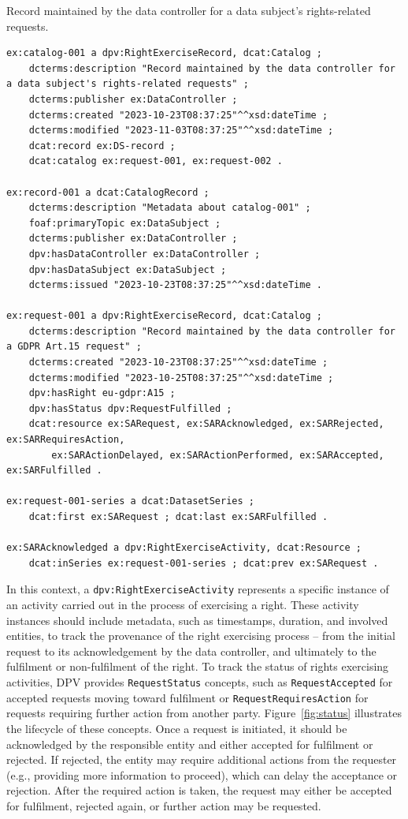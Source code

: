 \documentclass{IOS-Book-Article}     %
\begin{document}
\begin{listing}[ht]
\caption{Record maintained by the data controller for a data subject's rights-related requests.}
\label{lst:record}
\begin{verbatim}
ex:catalog-001 a dpv:RightExerciseRecord, dcat:Catalog ;
    dcterms:description "Record maintained by the data controller for a data subject's rights-related requests" ;
    dcterms:publisher ex:DataController ;
    dcterms:created "2023-10-23T08:37:25"^^xsd:dateTime ;
    dcterms:modified "2023-11-03T08:37:25"^^xsd:dateTime ;
    dcat:record ex:DS-record ;
    dcat:catalog ex:request-001, ex:request-002 .

ex:record-001 a dcat:CatalogRecord ;
    dcterms:description "Metadata about catalog-001" ;
    foaf:primaryTopic ex:DataSubject ;
    dcterms:publisher ex:DataController ;
    dpv:hasDataController ex:DataController ;
    dpv:hasDataSubject ex:DataSubject ;
    dcterms:issued "2023-10-23T08:37:25"^^xsd:dateTime .

ex:request-001 a dpv:RightExerciseRecord, dcat:Catalog ;
    dcterms:description "Record maintained by the data controller for a GDPR Art.15 request" ;
    dcterms:created "2023-10-23T08:37:25"^^xsd:dateTime ;
    dcterms:modified "2023-10-25T08:37:25"^^xsd:dateTime ;
    dpv:hasRight eu-gdpr:A15 ;
    dpv:hasStatus dpv:RequestFulfilled ;
    dcat:resource ex:SARequest, ex:SARAcknowledged, ex:SARRejected, ex:SARRequiresAction, 
        ex:SARActionDelayed, ex:SARActionPerformed, ex:SARAccepted, ex:SARFulfilled .

ex:request-001-series a dcat:DatasetSeries ;
    dcat:first ex:SARequest ; dcat:last ex:SARFulfilled .

ex:SARAcknowledged a dpv:RightExerciseActivity, dcat:Resource ;
    dcat:inSeries ex:request-001-series ; dcat:prev ex:SARequest .
\end{verbatim}
\end{listing}

In this context, a \texttt{dpv:RightExerciseActivity} represents a specific instance of an activity carried out in the process of exercising a right.
These activity instances should include metadata, such as timestamps, duration, and involved entities, to track the provenance of the right exercising process -- from the initial request to its acknowledgement by the data controller, and ultimately to the fulfilment or non-fulfilment of the right.
To track the status of rights exercising activities, DPV provides \texttt{RequestStatus} concepts, such as \texttt{RequestAccepted} for accepted requests moving toward fulfilment or \texttt{RequestRequiresAction} for requests requiring further action from another party.
Figure~\ref{fig:status} illustrates the lifecycle of these concepts.
Once a request is initiated, it should be acknowledged by the responsible entity and either accepted for fulfilment or rejected.
If rejected, the entity may require additional actions from the requester (e.g., providing more information to proceed), which can delay the acceptance or rejection.
After the required action is taken, the request may either be accepted for fulfilment, rejected again, or further action may be requested.
\end{document}
